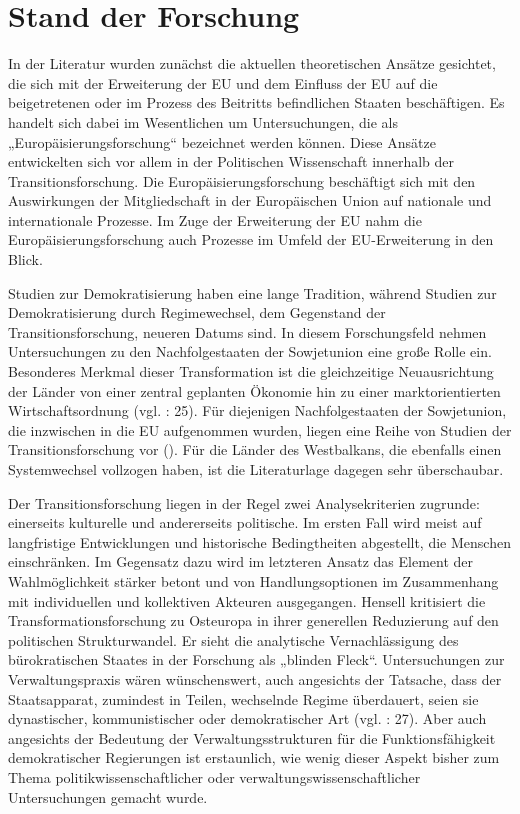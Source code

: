 \section{Stand der Forschung}
In der Literatur wurden zunächst die aktuellen theoretischen Ansätze gesichtet, die sich mit der Erweiterung der EU und dem Einfluss der EU auf die beigetretenen oder im Prozess des Beitritts befindlichen Staaten beschäftigen. Es handelt sich dabei im Wesentlichen um Untersuchungen, die als „Europäisierungsforschung“ bezeichnet werden können. Diese Ansätze entwickelten sich vor allem in der Politischen Wissenschaft innerhalb der Transitionsforschung. Die Europäisierungsforschung beschäftigt sich mit den Auswirkungen der Mitgliedschaft in der Europäischen Union auf nationale und internationale Prozesse. Im Zuge der Erweiterung der EU nahm die Europäisierungsforschung auch Prozesse im Umfeld der EU-Erweiterung in den Blick.\par
Studien zur Demokratisierung haben eine lange Tradition, während Studien zur Demokratisierung durch Regimewechsel, dem Gegenstand der Transitionsforschung, neueren Datums sind. In diesem Forschungsfeld nehmen Untersuchungen zu den Nachfolgestaaten der Sowjetunion eine große Rolle ein. Besonderes Merkmal dieser Transformation ist die gleichzeitige Neuausrichtung der Länder von einer zentral geplanten Ökonomie hin zu einer marktorientierten Wirtschaftsordnung (vgl. \cite{diaman} : 25). Für diejenigen Nachfolgestaaten der Sowjetunion, die inzwischen in die EU aufgenommen wurden, liegen eine Reihe von Studien der Transitionsforschung vor (\cite{dimit02,linden,grab05,kneuer07}). Für die Länder des Westbalkans, die ebenfalls einen Systemwechsel vollzogen haben, ist die Literaturlage dagegen sehr überschaubar. 
\par
Der Transitionsforschung liegen in der Regel zwei Analysekriterien zugrunde: einerseits kulturelle und andererseits politische. Im ersten Fall wird meist auf langfristige Entwicklungen und historische Bedingtheiten abgestellt, die Menschen einschränken. Im Gegensatz dazu wird im letzteren Ansatz das Element der Wahlmöglichkeit stärker betont und von Handlungsoptionen im Zusammenhang mit individuellen und kollektiven Akteuren ausgegangen. Hensell kritisiert die Transformationsforschung zu Osteuropa in ihrer generellen Reduzierung auf den politischen Strukturwandel. Er sieht die analytische Vernachlässigung des bürokratischen Staates in der Forschung als „blinden Fleck“. Untersuchungen zur Verwaltungspraxis wären wünschenswert, auch angesichts der Tatsache, dass der Staatsapparat, zumindest in Teilen, wechselnde Regime überdauert, seien sie dynastischer, kommunistischer oder demokratischer Art (vgl. \cite{hens09} : 27). Aber auch angesichts der Bedeutung der Verwaltungsstrukturen für die Funktionsfähigkeit demokratischer Regierungen ist erstaunlich, wie wenig dieser Aspekt bisher zum Thema politikwissenschaftlicher oder verwaltungswissenschaftlicher Untersuchungen gemacht wurde.
